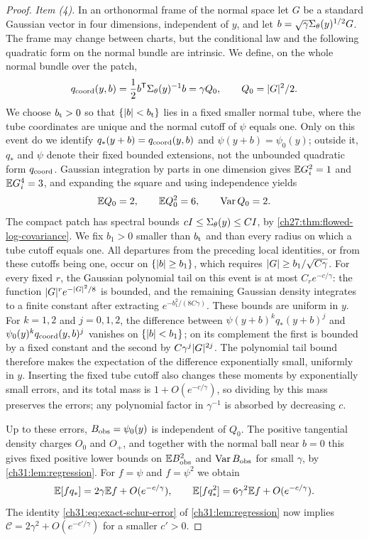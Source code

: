\begin{proof}
\emph{Item (4).} In an orthonormal frame of the normal space let $G$ be a standard Gaussian vector in four dimensions, independent of $y$, and let $b=\sqrt\gamma\Sigma_\theta(y)^{1/2}G$. The frame may change between charts, but the conditional law and the following quadratic form on the normal bundle are intrinsic. We define, on the whole normal bundle over the patch,
\begin{equation}\label{ch31:eq:matched-coordinate-quadratic}
 q_{\rm coord}(y,b)=\frac12b^{\mathsf T}\Sigma_\theta(y)^{-1}b=\gamma Q_0,\qquad Q_0=\lvert G\rvert^2/2.
\end{equation}
We choose $b_{\rm t}>0$ so that $\{\lvert b\rvert<b_{\rm t}\}$ lies in a fixed smaller normal tube, where the tube coordinates are unique and the normal cutoff of $\psi$ equals one. Only on this event do we identify $q_*(y+b)=q_{\rm coord}(y,b)$ and $\psi(y+b)=\psi_0(y)$; outside it, $q_*$ and $\psi$ denote their fixed bounded extensions, not the unbounded quadratic form $q_{\rm coord}$. Gaussian integration by parts in one dimension gives $\mathbb E G_i^2=1$ and $\mathbb E G_i^4=3$, and expanding the square and using independence yields
\[
 \mathbb E Q_0=2,\qquad\mathbb E Q_0^2=6,\qquad\operatorname{Var} Q_0=2.
\]
The compact patch has spectral bounds $cI\le\Sigma_\theta(y)\le CI$, by \cref{ch27:thm:flowed-log-covariance}. We fix $b_1>0$ smaller than $b_{\rm t}$ and than every radius on which a tube cutoff equals one. All departures from the preceding local identities, or from these cutoffs being one, occur on $\{\lvert b\rvert\ge b_1\}$, which requires $\lvert G\rvert\ge b_1/\sqrt{C\gamma}$. For every fixed $r$, the Gaussian polynomial tail on this event is at most $C_re^{-c/\gamma}$: the function $\lvert G\rvert^re^{-\lvert G\rvert^2/8}$ is bounded, and the remaining Gaussian density integrates to a finite constant after extracting $e^{-b_1^2/(8C\gamma)}$. These bounds are uniform in $y$. For $k=1,2$ and $j=0,1,2$, the difference between $\psi(y+b)^kq_*(y+b)^j$ and $\psi_0(y)^kq_{\rm coord}(y,b)^j$ vanishes on $\{\lvert b\rvert<b_1\}$; on its complement the first is bounded by a fixed constant and the second by $C\gamma^j\lvert G\rvert^{2j}$. The polynomial tail bound therefore makes the expectation of the difference exponentially small, uniformly in $y$. Inserting the fixed tube cutoff also changes these moments by exponentially small errors, and its total mass is $1+O(e^{-c/\gamma})$, so dividing by this mass preserves the errors; any polynomial factor in $\gamma^{-1}$ is absorbed by decreasing $c$.

Up to these errors, $B_{\mathrm{obs}}=\psi_0(y)$ is independent of $Q_0$. The positive tangential density charges $O_0$ and $O_+$, and together with the normal ball near $b=0$ this gives fixed positive lower bounds on $\mathbb EB_{\mathrm{obs}}^2$ and $\operatorname{Var}B_{\mathrm{obs}}$ for small $\gamma$, by \cref{ch31:lem:regression}. For $f=\psi$ and $f=\psi^2$ we obtain
\[
 \mathbb E[fq_*]=2\gamma\mathbb E f+O(e^{-c/\gamma}),\qquad\mathbb E[fq_*^2]=6\gamma^2\mathbb E f+O(e^{-c/\gamma}).
\]
The identity \eqref{ch31:eq:exact-schur-error} of \cref{ch31:lem:regression} now implies $\mathscr C=2\gamma^2+O(e^{-c'/\gamma})$ for a smaller $c'>0$.
\end{proof}

